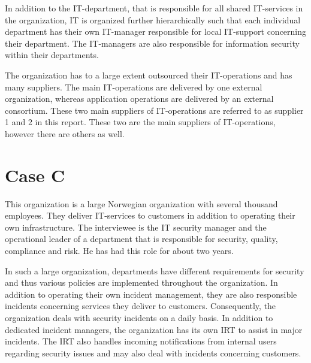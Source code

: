 In addition to the IT-department, that is responsible for all shared IT-services in the organization, IT is organized further hierarchically such that each individual department has their own IT-manager responsible for local IT-support concerning their department. The IT-managers are also responsible for information security within their departments.

The organization has to a large extent outsourced their IT-operations and has many suppliers. The main IT-operations are delivered by one external organization, whereas application operations are delivered by an external consortium. These two main suppliers of IT-operations are referred to as supplier 1 and 2 in this report. These two are the main suppliers of IT-operations, however there are others as well. 


\section{Case C}
This organization is a large Norwegian organization with several thousand employees. They deliver IT-services to customers in addition to operating their own infrastructure. The interviewee is the IT security manager  and the operational leader of a department that is responsible for security, quality, compliance and risk. He has had this role for about two years.

In such a large organization, departments have different requirements for security and thus various policies are implemented throughout the organization. In addition to operating their own incident management, they are also responsible incidents concerning services they deliver to customers. Consequently, the organization deals with security incidents on a daily basis. In addition to dedicated incident managers, the organization has its own \ac{IRT} to assist in major incidents. The \ac{IRT} also handles incoming notifications from internal users regarding security issues and may also deal with incidents concerning customers. 